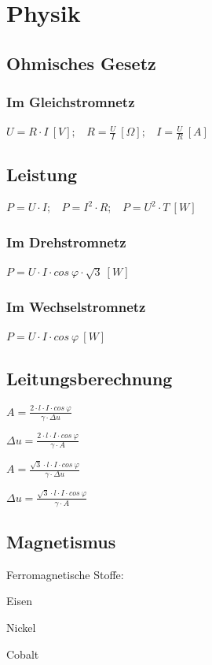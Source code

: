 \documentclass[12pt,a4paper]{article}
\begin{document}
\pagebreak
\section{Physik}
\subsection{Ohmisches Gesetz}
\subsubsection{Im Gleichstromnetz}
$U = R \cdot I~[V];~~~~R = \frac{U}{I}~[\Omega];~~~~I = \frac{U}{R}~[A]$
\subsection{Leistung}
$P = U \cdot I;~~~~P = I^{2} \cdot R;~~~~P = U^{2} \cdot T~[W]$
\subsubsection{Im Drehstromnetz}
$P = U \cdot I \cdot cos~\varphi \cdot \sqrt{3}~[W]$
\subsubsection{Im Wechselstromnetz}
$P = U \cdot I \cdot cos~\varphi~[W]$
\subsection{Leitungsberechnung}
\begin{description}
\item $A = \frac{2 \cdot l \cdot I \cdot cos~\varphi}{\gamma \cdot \Delta u}$
\item $\Delta u = \frac{2 \cdot l \cdot I \cdot cos~\varphi}{\gamma \cdot A}$
\item $A = \frac{\sqrt{3} \cdot l \cdot I \cdot cos~\varphi}{\gamma \cdot \Delta u}$
\item $\Delta u = \frac{\sqrt{3} \cdot l \cdot I \cdot cos~\varphi}{\gamma \cdot A}$
\end{description}
\subsection{Magnetismus}
Ferromagnetische Stoffe:
\begin{description}
\item Eisen
\item Nickel
\item Cobalt
\end{description}
\end{document}
